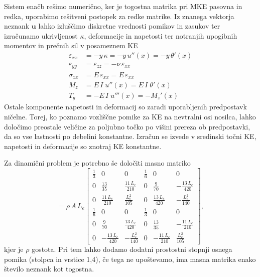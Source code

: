 Sistem enačb rešimo numerično, ker je togostna matrika pri MKE pasovna in redka, uporabimo rešitveni postopek za redke matrike. Iz znanega vektorja neznank $\mathbf{u}$ lahko izluščimo diskretne vrednosti pomikov in zasukov ter izračunamo ukrivljenost $\kappa$,  deformacije in napetosti ter notranjih upogibnih momentov in prečnih sil v posameznem KE
\begin{align}\label{eq:def_nap_eb}
    \varepsilon_{xx} &= -y\,\kappa = -y\,u''(x) = -y\,\theta'(x)\\
    \varepsilon_{yy} &= \varepsilon_{zz} = -\nu\,\varepsilon_{xx}\\
    \sigma_{xx} &= E\,\varepsilon_{xx} = E\,\varepsilon_{xx}\\
    M_z &= E\,I\; u''(x) = E\,I\;\theta'(x)\\
    T_y &= -E\,I\; u'''(x) = -M_z'(x)
\end{align}
Ostale komponente napetosti in deformacij so zaradi uporabljenih predpostavk ničelne.
Torej, ko poznamo vozliščne pomike za KE na nevtralni osi nosilca, lahko določimo preostale veličine za poljubno točko po višini prereza ob predpostavki, da so vse lastnosti po debelini konstantne. Izračun se izvede v sredinski točni KE, napetosti in deformacije so znotraj KE konstantne.

Za dinamični problem je potrebno še določiti masno matriko
\begin{equation} %
    [\mathbf{K}_e] = \rho\,A\,L_e\begin{bmatrix}
        \frac{1}{3} & 0 & 0 & \frac{1}{6} & 0 & 0\\
        0 & \frac{13}{35} & \frac{11\,L_e}{210} & 0 & \frac{9}{70} & -\frac{13\,L_e}{420}\\
        0 & \frac{11\,L_e}{210} & \frac{L_e^2}{105} & 0 & \frac{13\,L_e}{420} & -\frac{L_e^2}{140}\\
        \frac{1}{6} & 0 & 0 & \frac{1}{3} & 0 & 0\\
        0 & \frac{9}{70} & \frac{13\,L_e}{420} & 0 & \frac{13}{35} & -\frac{11\,L_e}{210}\\
        0 & -\frac{13\,L_e}{420} & -\frac{L_e^2}{140} & 0 & -\frac{11\,L_e}{210} & \frac{L_e^2}{105}
    \end{bmatrix},
    \label{eq:masna}
\end{equation}
kjer je $\rho$ gostota. Pri tem lahko dodamo dodatni prostostni stopnji osnega pomika (stolpca in vrstice 1,4), če tega ne upoštevamo, ima masna matrika enako število neznank kot togostna.

